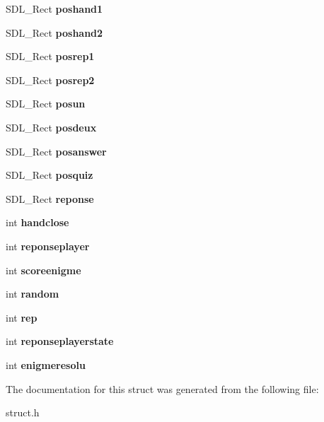 \begin{DoxyCompactItemize}
S\+D\+L\+\_\+\+Rect {\bfseries poshand1}
\item 
\mbox{\label{structenigme_af6e44df3b2452c72d87d5c7681fd160c}} 
S\+D\+L\+\_\+\+Rect {\bfseries poshand2}
\item 
\mbox{\label{structenigme_aa41e1287b7583b5440bc32d04660c5e5}} 
S\+D\+L\+\_\+\+Rect {\bfseries posrep1}
\item 
\mbox{\label{structenigme_ad6b7b05138ce5157e260cad0d1407271}} 
S\+D\+L\+\_\+\+Rect {\bfseries posrep2}
\item 
\mbox{\label{structenigme_aa81898935156d1686a81ec6cb8e7507f}} 
S\+D\+L\+\_\+\+Rect {\bfseries posun}
\item 
\mbox{\label{structenigme_a8c486911736ba0204568761927c6b9f3}} 
S\+D\+L\+\_\+\+Rect {\bfseries posdeux}
\item 
\mbox{\label{structenigme_ad00e6674a1862c35b676d2086dc66265}} 
S\+D\+L\+\_\+\+Rect {\bfseries posanswer}
\item 
\mbox{\label{structenigme_a6078fdf410db065ce21e11599ca6d0a4}} 
S\+D\+L\+\_\+\+Rect {\bfseries posquiz}
\item 
\mbox{\label{structenigme_aa15496361ed73c0ba5df2793370fd6d8}} 
S\+D\+L\+\_\+\+Rect {\bfseries reponse}
\item 
\mbox{\label{structenigme_a0f991a3c8fad2da556415fbc89df477b}} 
int {\bfseries handclose}
\item 
\mbox{\label{structenigme_a092b8c95c440e6fe68572bb4f80882ad}} 
int {\bfseries reponseplayer}
\item 
\mbox{\label{structenigme_a5c3c1be5f426abd6512176b9f31b90e7}} 
int {\bfseries scoreenigme}
\item 
\mbox{\label{structenigme_aca75de3e0894e4e56e0f84a19adfc37e}} 
int {\bfseries random}
\item 
\mbox{\label{structenigme_a9c96fd872bc111d42c394eb466cfc50a}} 
int {\bfseries rep}
\item 
\mbox{\label{structenigme_ab94caae0675568e58f44e338c4582046}} 
int {\bfseries reponseplayerstate}
\item 
\mbox{\label{structenigme_ae821671d03e9a9e29afb7a17882cd490}} 
int {\bfseries enigmeresolu}
\end{DoxyCompactItemize}


The documentation for this struct was generated from the following file\+:\begin{DoxyCompactItemize}
\item 
struct.\+h\end{DoxyCompactItemize}

